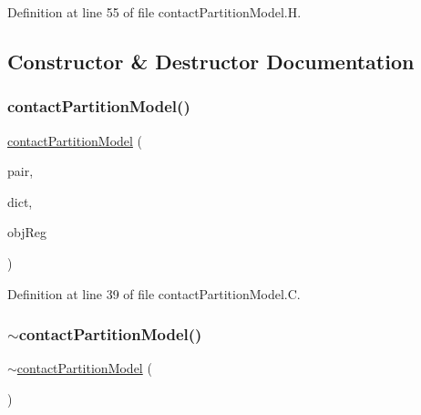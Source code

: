 Definition at line 55 of file contact\+Partition\+Model.\+H.



\subsection{Constructor \& Destructor Documentation}
\mbox{\label{classFoam_1_1contactPartitionModel_ab888019d937118992279c8f3a8ec0be0}} 
\subsubsection{\texorpdfstring{contact\+Partition\+Model()}{contactPartitionModel()}}
{\footnotesize\ttfamily \hyperlink{classFoam_1_1contactPartitionModel}{contact\+Partition\+Model} (\begin{DoxyParamCaption}\item[{const \hyperlink{classFoam_1_1FSPair}{F\+S\+Pair} \&}]{pair,  }\item[{const dictionary \&}]{dict,  }\item[{const object\+Registry \&}]{obj\+Reg }\end{DoxyParamCaption})}



Definition at line 39 of file contact\+Partition\+Model.\+C.

\mbox{\label{classFoam_1_1contactPartitionModel_a5dabd3b53e509aebb4594f68be3cd5d4}} 
\subsubsection{\texorpdfstring{$\sim$contact\+Partition\+Model()}{~contactPartitionModel()}}
{\footnotesize\ttfamily $\sim$\hyperlink{classFoam_1_1contactPartitionModel}{contact\+Partition\+Model} (\begin{DoxyParamCaption}{ }\end{DoxyParamCaption})\hspace{0.3cm}{\ttfamily [virtual]}}



